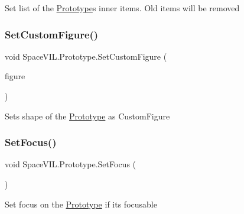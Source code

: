 Set list of the \mbox{\hyperlink{class_space_v_i_l_1_1_prototype}{Prototype}}\textquotesingle{}s inner items. Old items will be removed 

\mbox{\label{class_space_v_i_l_1_1_prototype_a7c6bb62d8c795366532c7295b2b71d30}} 
\subsubsection{\texorpdfstring{Set\+Custom\+Figure()}{SetCustomFigure()}}
{\footnotesize\ttfamily void Space\+V\+I\+L.\+Prototype.\+Set\+Custom\+Figure (\begin{DoxyParamCaption}\item[{\mbox{\hyperlink{class_space_v_i_l_1_1_decorations_1_1_custom_figure}{Custom\+Figure}}}]{figure }\end{DoxyParamCaption})}



Sets shape of the \mbox{\hyperlink{class_space_v_i_l_1_1_prototype}{Prototype}} as Custom\+Figure 

\mbox{\label{class_space_v_i_l_1_1_prototype_aa91a8d681b1d1c597aa87d644c9e19a5}} 
\subsubsection{\texorpdfstring{Set\+Focus()}{SetFocus()}}
{\footnotesize\ttfamily void Space\+V\+I\+L.\+Prototype.\+Set\+Focus (\begin{DoxyParamCaption}{ }\end{DoxyParamCaption})}



Set focus on the \mbox{\hyperlink{class_space_v_i_l_1_1_prototype}{Prototype}} if its focusable 

\mbox{\label{class_space_v_i_l_1_1_prototype_a3f460b82d96e624ae4f2c203774d6c60}} 
